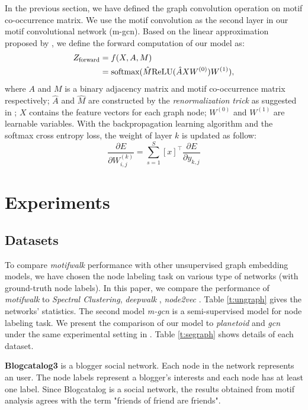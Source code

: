 \documentclass{article}
\theoremstyle{definition}
\begin{document}
In the previous section, we have defined the graph convolution
operation on motif co-occurrence matrix. We use the motif convolution
as the second layer in our motif convolutional network (m-gcn). Based on the 
linear approximation proposed by \citeauthor{gcn}, we define the forward
computation of our model as:
\begin{equation} \label{eq:2}
    \begin{aligned}
    Z_{\scalebox{0.75}{forward}} &= f(X,A,M) \\
    &= \mbox{softmax}(\hat{M} \mbox{ReLU}(\hat{A}XW^{(0)})W^{(1)}),
    \end{aligned}
\end{equation}
where $A$ and $M$ is a binary adjacency matrix and motif co-occurrence
matrix respectively; $\hat{A}$ and $\hat{M}$ are constructed by the
\emph{renormalization trick} as suggested in \cite{gcn}; $X$ contains
the feature vectors for each graph node; $W^{(0)}$ and $W^{(1)}$ are
learnable variables. With the backpropagation learning algorithm and the
softmax cross entropy loss, the weight of layer $k$ is updated as follow: 
\begin{equation}
\label{eq:3}
\frac{\partial E}{\partial W^{(k)}_{i,j}} = \sum^S_{s=1} [x]^\top \frac{\partial E}{\partial y_{k,j}}
\end{equation}

\section{Experiments}

\subsection{Datasets}

To compare \emph{motifwalk} performance with other unsupervised graph
embedding models, we have chosen the node labeling task on various
type of networks (with ground-truth node labels). In this paper, we
compare the performance of \emph{motifwalk} to 
\emph{Spectral Clustering}, 
\emph{deepwalk} \cite{deepwalk}, \emph{node2vec} \cite{node2vec}. Table \ref{t:ungraph}
gives the networks' statistics. The second model \emph{m-gcn} is a semi-supervised model for node
labeling task. We present the comparison of our model to \emph{planetoid} and
\emph{gcn} under the same experimental setting in \cite{gcn}. Table \ref{t:segraph}
shows details of each dataset.

\textbf{Blogcatalog3} \cite{blogcatalog} is a blogger social network. Each node
in the network represents an user. The node labels represent a blogger's interests and
each node has at least one label. Since Blogcatalog is a social network, the results
obtained from motif analysis agrees with the term "friends of friend are friends".
\end{document}
